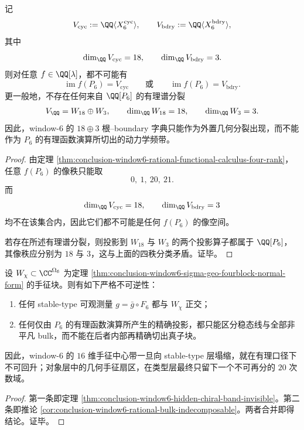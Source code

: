 \begin{corollary}\label{cor:conclusion-window6-rational-functional-calculus-no-18plus3-image}
记
\[
V_{\mathrm{cyc}}:=\QQ\langle X_6^{\mathrm{cyc}}\rangle,
\qquad
V_{\mathrm{bdry}}:=\QQ\langle X_6^{\mathrm{bdry}}\rangle,
\]
其中
\[
\dim_{\QQ}V_{\mathrm{cyc}}=18,
\qquad
\dim_{\QQ}V_{\mathrm{bdry}}=3.
\]
则对任意 \(f\in\QQ[\lambda]\)，都不可能有
\[
\operatorname{im}f(P_6)=V_{\mathrm{cyc}}
\qquad\text{或}\qquad
\operatorname{im}f(P_6)=V_{\mathrm{bdry}}.
\]
更一般地，不存在任何来自 \(\QQ[P_6]\) 的有理谱分裂
\[
V_{\QQ}=W_{18}\oplus W_3,
\qquad
\dim_{\QQ}W_{18}=18,
\qquad
\dim_{\QQ}W_3=3.
\]
因此，window-\(6\) 的 \(18\oplus 3\) 根--boundary 字典只能作为外置几何分裂出现，而不能作为 \(P_6\) 的有理函数演算所切出的动力学频带。
\end{corollary}
\begin{proof}
由定理 \ref{thm:conclusion-window6-rational-functional-calculus-four-rank}，任意 \(f(P_6)\) 的像秩只能取
\[
0,\ 1,\ 20,\ 21.
\]
而
\[
\dim_{\QQ}V_{\mathrm{cyc}}=18,
\qquad
\dim_{\QQ}V_{\mathrm{bdry}}=3
\]
均不在该集合内，因此它们都不可能是任何 \(f(P_6)\) 的像空间。

若存在所述有理谱分裂，则投影到 \(W_{18}\) 与 \(W_3\) 的两个投影算子都属于 \(\QQ[P_6]\)，其像秩应分别为 \(18\) 与 \(3\)，这与上面的四秩分类矛盾。证毕。
\end{proof}

\begin{theorem}\label{thm:conclusion-window6-chiral-band-nonrecoverability}
设 \(W_\chi\subset \CC^{\Omega_6}\) 为定理 \ref{thm:conclusion-window6-sigma-geo-fourblock-normal-form} 的手征块。则有如下严格不可逆性：
\begin{enumerate}
  \item 任何 stable-type 可观测量 \(g=\bar g\circ F_6\) 都与 \(W_\chi\) 正交；
  \item 任何仅由 \(P_6\) 的有理函数演算所产生的精确投影，都只能区分稳态线与全部非平凡 bulk，而不能在后者内部再精确切出真子块。
\end{enumerate}
因此，window-\(6\) 的 \(16\) 维手征中心带一旦向 stable-type 层塌缩，就在有理口径下不可回升；对象层中的几何手征扇区，在类型层最终只留下一个不可再分的 \(20\) 次数域。
\end{theorem}
\begin{proof}
第一条即定理 \ref{thm:conclusion-window6-hidden-chiral-band-invisible}。第二条即推论 \ref{cor:conclusion-window6-rational-bulk-indecomposable}。两者合并即得结论。证毕。
\end{proof}

